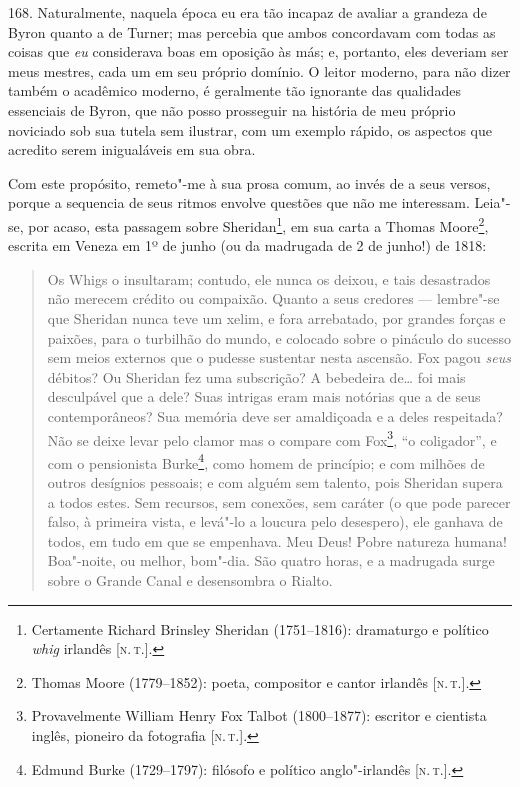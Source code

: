 168. Naturalmente, naquela época eu era tão incapaz de avaliar a
grandeza de Byron quanto a de Turner; mas percebia que ambos concordavam
com todas as coisas que \emph{eu} considerava boas em oposição às más;
e, portanto, eles deveriam ser meus mestres, cada um em seu próprio
domínio. O leitor moderno, para não dizer também o acadêmico moderno, é
geralmente tão ignorante das qualidades essenciais de Byron, que não
posso prosseguir na história de meu próprio noviciado sob sua tutela sem
ilustrar, com um exemplo rápido, os aspectos que acredito serem
inigualáveis em sua obra.

Com este propósito, remeto"-me à sua prosa comum, ao invés de a seus
versos, porque a sequencia de seus ritmos envolve questões que não me
interessam. Leia"-se, por acaso, esta passagem sobre Sheridan\footnote{Certamente
  Richard Brinsley Sheridan (1751--1816): dramaturgo e político
  \emph{whig} irlandês {[}\textsc{n.\,t.}{]}.}, em sua carta a Thomas
Moore\footnote{Thomas Moore (1779--1852): poeta, compositor e cantor
  irlandês {[}\textsc{n.\,t.}{]}.}, escrita em Veneza em 1º de junho (ou da
madrugada de 2 de junho!) de 1818: %

\begin{quote}
Os Whigs o insultaram; contudo, ele nunca os deixou, e tais
desastrados não merecem crédito ou compaixão. Quanto a seus credores ---
lembre"-se que Sheridan nunca teve um xelim, e fora arrebatado, por
grandes forças e paixões, para o turbilhão do mundo, e colocado sobre o
pináculo do sucesso sem meios externos que o pudesse sustentar nesta
ascensão. Fox pagou \emph{seus} débitos? Ou Sheridan fez uma subscrição?
A bebedeira de\ldots{} foi mais desculpável que a dele? Suas intrigas eram
mais notórias que a de seus contemporâneos? Sua memória deve ser
amaldiçoada e a deles respeitada? Não se deixe levar pelo clamor mas o
compare com Fox\footnote{Provavelmente William Henry Fox Talbot
  (1800--1877): escritor e cientista inglês, pioneiro da fotografia {[}\textsc{n.\,t.}{]}.}, ``o coligador'', e com o pensionista Burke\footnote{Edmund
  Burke (1729--1797): filósofo e político anglo"-irlandês {[}\textsc{n.\,t.}{]}.},
como homem de princípio; e com milhões de outros desígnios pessoais; e
com alguém sem talento, pois Sheridan supera a todos estes. Sem
recursos, sem conexões, sem caráter (o que pode parecer falso, à
primeira vista, e levá"-lo a loucura pelo desespero), ele ganhava de
todos, em tudo em que se empenhava. Meu Deus! Pobre natureza humana!
Boa"-noite, ou melhor, bom"-dia. São quatro horas, e a madrugada surge
sobre o Grande Canal e desensombra o Rialto.
\end{quote}

